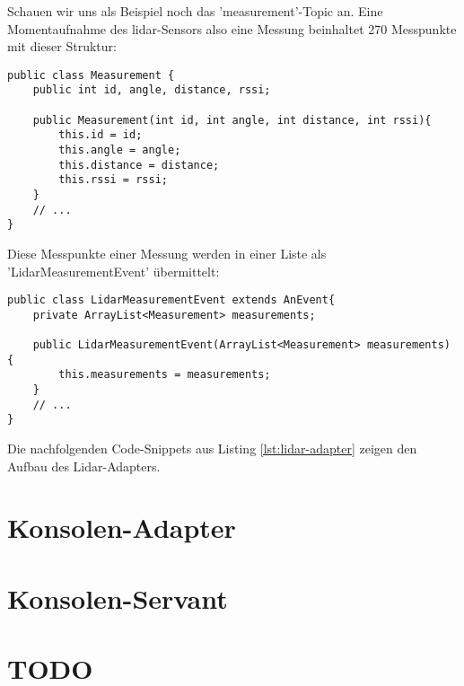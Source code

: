 Schauen wir uns als Beispiel noch das 'measurement'-Topic an. Eine Momentaufnahme des \acrshort{lidar}-Sensors also eine Messung beinhaltet 270 Messpunkte mit dieser Struktur:
\begin{lstlisting}[caption={Lidar-Adapter - Struktur der Messpunkte},label={lst:lidar_measurement}]
public class Measurement {
	public int id, angle, distance, rssi;
	
	public Measurement(int id, int angle, int distance, int rssi){
		this.id = id;
		this.angle = angle;
		this.distance = distance;
		this.rssi = rssi;
	}
	// ...
}
\end{lstlisting}
Diese Messpunkte einer Messung werden in einer Liste als 'LidarMeasurementEvent' übermittelt:
\begin{lstlisting}[caption={Lidar-Adapter - Struktur des 'LidarMeasurementEvent'},label={lst:lidar_measurementevent}]
public class LidarMeasurementEvent extends AnEvent{
	private ArrayList<Measurement> measurements;
	
	public LidarMeasurementEvent(ArrayList<Measurement> measurements) {
		this.measurements = measurements;
	}
	// ...
}
\end{lstlisting}

Die nachfolgenden Code-Snippets aus Listing \ref{lst:lidar-adapter} zeigen den Aufbau des Lidar-Adapters.



\section{Konsolen-Adapter}

\section{Konsolen-Servant}

\section{TODO}

